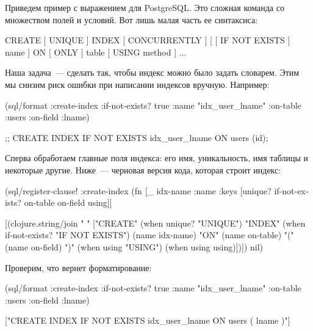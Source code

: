 Приведем пример с выражением  для PostgreSQL. Это сложная команда со множеством полей и условий. Вот лишь малая часть ее синтаксиса:

\begin{english}
  \begin{sql}
CREATE [ UNIQUE ] INDEX [ CONCURRENTLY ]
    [ [ IF NOT EXISTS ] name ]
    ON [ ONLY ] table
    [ USING method ] ...
  \end{sql}
\end{english}

Наша задача~--- сделать так, чтобы индекс можно было задать словарем. Этим мы снизим риск ошибки при написании индексов вручную. Например:

\begin{english}
  \begin{clojure}
(sql/format
  {:create-index {:if-not-exists? true
                  :name "idx_user_lname"
                  :on-table :users
                  :on-field :lname}})

;; CREATE INDEX IF NOT EXISTS idx_user_lname ON users (id);
  \end{clojure}
\end{english}

Сперва обработаем главные поля индекса: его имя, уникальность, имя таблицы и некоторые другие. Ниже~--- черновая версия кода, которая строит индекс:

\begin{english}
  \begin{clojure}
(sql/register-clause!
 :create-index
 (fn [_ {idx-name :name
         :keys [unique?
                if-not-exists?
                on-table
                on-field
                using]}]

   [(clojure.string/join
     " "
     ["CREATE"
      (when unique? "UNIQUE")
      "INDEX"
      (when if-not-exists? "IF NOT EXISTS")
      (name idx-name)
      "ON"
      (name on-table)
      "(" (name on-field) ")"
      (when using "USING")
      (when using using)])])
 nil)
  \end{clojure}
\end{english}

Проверим, что вернет форматирование:

\begin{english}
  \begin{clojure}
(sql/format {:create-index {:if-not-exists? true
                            :name "idx_user_lname"
                            :on-table :users
                            :on-field :lname}})

["CREATE INDEX IF NOT EXISTS idx_user_lname ON users ( lname )"]
  \end{clojure}
\end{english}

